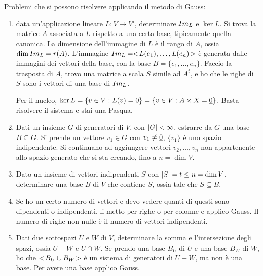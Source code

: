 Problemi che si possono risolvere applicando il metodo di Gauss:
\begin{enumerate}
    \item data un'applicazione lineare $L : V \to V'$, determinare $Im_{L}$ e $\ker L$. Si trova la matrice $A$ associata a $L$ rispetto a una certa base, tipicamente quella canonica. La dimensione dell'immagine di $L$ \`e il rango di $A$, ossia $\dim Im_{L} = r(A)$. L'immagine $Im_{L} = <\!{ L(e_1), \ldots, L(e_n)}\!>$ \`e generata dalle immagini dei vettori della base, con la base $B = \{ e_1, \ldots, e_n \}$. Faccio la trasposta di $A$, trovo una matrice a scala $S$ simile ad $A^t$, e ho che le righe di $S$ sono i vettori di una base di $Im_{L}$.

    Per il nucleo, $\ker L = \{ v \in V : L(v) = 0 \} = \{ v \in V : A \times X = \underline{0} \}$. Basta risolvere il sistema e stai una Pasqua.
    \item Dati un insieme $G$ di generatori di $V$, con $\left\lvert{G}\right\rvert < \infty$, estrarre da $G$ una base $B \subseteq G$. Si prende un vettore $v_1 \in G$ con $v_1 \neq \underline{0}$, $\{v_1\}$ \`e uno spazio indipendente. Si continuano ad aggiungere vettori $v_2, \ldots, v_n$ non appartenente allo spazio generato che si sta creando, fino a $n = \dim V$.
    \item Dato un insieme di vettori indipendenti $S$ con $\left\lvert{S}\right\rvert = t \le n = \dim V$, determinare una base $B$ di $V$ che contiene $S$, ossia tale che $S \subseteq B$.
    \item Se ho un certo numero di vettori e devo vedere quanti di questi sono dipendenti o indipendenti, li metto per righe o per colonne e applico Gauss. Il numero di righe non nulle \`e il numero di vettori indipendenti.
    \item Dati due sottospazi $U$ e $W$ di $V$, determinare la somma e l'intersezione degli spazi, ossia $U + W$ e $U \cap W$. Se prendo una base $B_U$ di $U$ e una base $B_W$ di $W$, ho che $<\!{B_U \cup B_W}\!>$ \`e un sistema di generatori di $U + W$, ma non \`e una base. Per avere una base applico Gauss. 
\end{enumerate}

